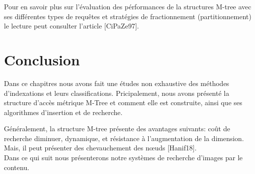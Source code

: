 Pour en savoir plus sur l'évaluation des pérformances de la structures M-tree avec ses différentes types de requêtes et stratégies de fractionnement (partitionnement) le lecture peut consulter l'article [CiPaZe97].

\section{Conclusion}
Dans ce chapitres nous avons fait une études non exhaustive des méthodes d'indexations et leurs classifications. Pricipalement, nous avons présenté la structure d'accès métrique M-Tree et comment elle est construite, ainsi que ses algorithmes d'insertion et de recherche.

Généralement, la structure M-tree présente des avantages suivants: coût de recherche diminuer, dynamique, et résistance à l’augmentation de
la dimension. Mais, il peut présenter des chevauchement des nœuds [Hanif18].\\


Dans ce qui suit nous présenterons notre systèmes de recherche d'images par le contenu.

%
%
%
%


